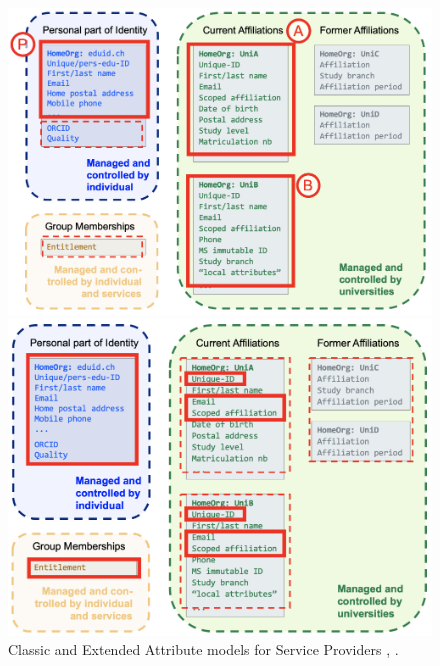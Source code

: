 \begin{figure}[H]
	\begin{minipage}{0.49\linewidth}
		\includegraphics[width=\textwidth]{figs/ch4/classic-attribute-model}
	\end{minipage}%
	\hfill%
	\begin{minipage}{0.49\linewidth}
		\includegraphics[width=\textwidth]{figs/ch4/extended-attribute-model}
	\end{minipage}
	\caption{Classic and Extended Attribute models for Service Providers \cite{classic-attribute-model}, \cite{eduid-extended-attribute-model}.}
	\label{fig:attribute-models}
\end{figure}

